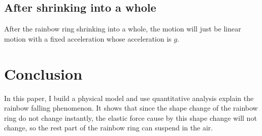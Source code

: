 \documentclass[12pt]{article}
\begin{document}
\subsection*{After shrinking into a whole}
After the rainbow ring shrinking into a whole, the motion will just be linear motion with a fixed acceleration whose acceleration is $g$.
\section*{Conclusion}
\label{sec:con}
In this paper, I build a physical model and use quantitative analysis explain the rainbow falling phenomenon. It shows that since the shape change of the rainbow ring do not change instantly, the elastic force cause by this shape change will not change, so the rest part of the rainbow ring can suspend in the air.
\end{document}

